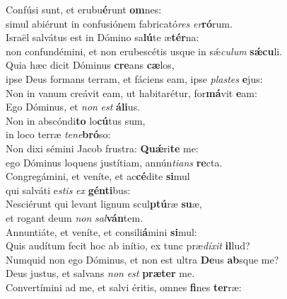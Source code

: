 \evenverse Confúsi sunt, et erubu\textbf{é}runt \textbf{om}nes:~\*\\
\evenverse simul abiérunt in confusiónem fabricató\textit{res} \textit{er}\textbf{ró}rum.\\
\oddverse Israël salvátus est in Dómino sa\textbf{lú}te æ\textbf{tér}na:~\*\\
\oddverse non confundémini, et non erubescétis usque in sǽ\textit{cu}\textit{lum} \textbf{sǽ}\textbf{cu}li.\\
\evenverse Quia hæc dicit Dóminus \textbf{cre}ans \textbf{cæ}los,~\*\\
\evenverse ipse Deus formans terram, et fáciens eam, ipse \textit{pla}\textit{stes} \textbf{e}jus:\\
\oddverse Non in vanum creávit eam, ut habitarétur, for\textbf{má}vit \textbf{e}am:~\*\\
\oddverse Ego Dóminus, et \textit{non} \textit{est} \textbf{á}\textbf{li}us.\\
\evenverse Non in abscóndi\textbf{to} lo\textbf{cú}tus sum,~\*\\
\evenverse in loco terræ \textit{te}\textit{ne}\textbf{bró}so:\\
\oddverse Non dixi sémini Jacob frustra: \textbf{Quǽ}ri\textbf{te} me:~\*\\
\oddverse ego Dóminus loquens justítiam, annún\textit{ti}\textit{ans} \textbf{re}cta.\\
\evenverse Congregámini, et veníte, et ac\textbf{cé}dite \textbf{si}mul~\*\\
\evenverse qui salváti e\textit{stis} \textit{ex} \textbf{gén}\textbf{ti}bus:\\
\oddverse Nesciérunt qui levant lignum scul\textbf{ptú}ræ \textbf{su}æ,~\*\\
\oddverse et rogant deum \textit{non} \textit{sal}\textbf{ván}tem.\\
\evenverse Annuntiáte, et veníte, et consili\textbf{á}mini \textbf{si}mul:~\*\\
\evenverse Quis audítum fecit hoc ab inítio, ex tunc præ\textit{dí}\textit{xit} \textbf{il}lud?\\
\oddverse Numquid non ego Dóminus, et non est ultra \textbf{De}us \textbf{ab}sque me?~\*\\
\oddverse Deus justus, et salvans \textit{non} \textit{est} \textbf{præ}\textbf{ter} me.\\
\evenverse Convertímini ad me, et salvi éritis, omnes \textbf{fi}nes \textbf{ter}ræ:~\*\\
